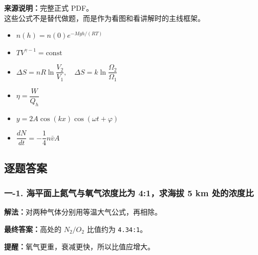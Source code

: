 \documentclass[12pt,a4paper]{ctexart}
\begin{document}
\begin{tcolorbox}[title=本卷讲解会反复用到的公式,colback=blue!3!white,colframe=blue!45!black]
\textbf{来源说明：}完整正式 PDF。\\
这些公式不是替代做题，而是作为看图和看讲解时的主线框架。
\begin{itemize}
\item $n(h)=n(0)e^{-Mgh/(RT)}$
\item $TV^{\gamma-1}=\mathrm{const}$
\item $\Delta S=nR\ln\dfrac{V_2}{V_1},\quad \Delta S=k\ln\dfrac{\Omega_2}{\Omega_1}$
\item $\eta=\dfrac{W}{Q_h}$
\item $y=2A\cos(kx)\cos(\omega t+\varphi)$
\item $\dfrac{dN}{dt}=-\dfrac14 n\bar v A$
\end{itemize}
\end{tcolorbox}


\subsection*{逐题答案}

\subsubsection*{一-1. 海平面上氮气与氧气浓度比为 4:1，求海拔 5 km 处的浓度比}
\begin{tcolorbox}[colback=gray!2!white,colframe=black!60,title={题目}]

\end{tcolorbox}
\begin{tcolorbox}[colback=blue!2!white,colframe=blue!55!black,title={完整答案}]
\textbf{解法：}对两种气体分别用等温大气公式，再相除。\par
\textbf{最终答案：}高处的 \(N_2/O_2\) 比值约为 \texttt{4.34:1}。\par

\end{tcolorbox}
\begin{tcolorbox}[colback=red!2!white,colframe=red!55!black,title={易错点}]
\textbf{提醒：}氧气更重，衰减更快，所以比值应增大。\par
\end{tcolorbox}
\end{document}
